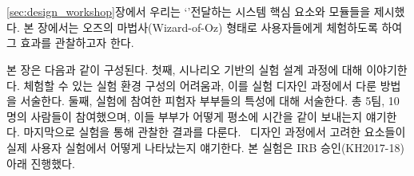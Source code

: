 \chapter{\expUser}
\label{sec:userstudy}

\ref{sec:design_workshop}장에서 우리는 `\concept'\를 전달하는 시스템  핵심 요소와 모듈들을 제시했다. 본 장에서는 \sysname\을 오즈의 마법사(Wizard-of-Oz) 형태로 사용자들에게 체험하도록 하여 그 효과를 관찰하고자 한다.

본 장은 다음과 같이 구성된다. 첫째, 시나리오 기반의 실험 설계 과정에 대해 이야기한다. \concept\를 체험할 수 있는 실험 환경 구성의 어려움과, 이를 실험 디자인 과정에서 다룬 방법을 서술한다. 둘째, 실험에 참여한 피험자 부부들의 특성에 대해 서술한다. 총 5팀, 10명의 사람들이 참여했으며, 이들 부부가 어떻게 평소에 시간을 같이 보내는지 얘기한다. 마지막으로 실험을 통해 관찰한 결과를 다룬다. \sysname\ 디자인 과정에서 고려한 요소들이 실제 사용자 실험에서 어떻게 나타났는지 얘기한다. 본 실험은 IRB 승인(KH2017-18) 아래 진행했다.



